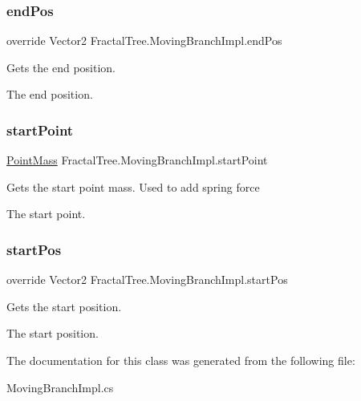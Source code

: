 \subsubsection{\texorpdfstring{end\+Pos}{endPos}}
{\footnotesize\ttfamily override Vector2 Fractal\+Tree.\+Moving\+Branch\+Impl.\+end\+Pos\hspace{0.3cm}{\ttfamily [get]}}



Gets the end position. 

The end position.\hypertarget{class_fractal_tree_1_1_moving_branch_impl_a360370cd5f0fb613596cb8d0fe942ffe}{}\label{class_fractal_tree_1_1_moving_branch_impl_a360370cd5f0fb613596cb8d0fe942ffe} 
\subsubsection{\texorpdfstring{start\+Point}{startPoint}}
{\footnotesize\ttfamily \hyperlink{class_fractal_tree_1_1_point_mass}{Point\+Mass} Fractal\+Tree.\+Moving\+Branch\+Impl.\+start\+Point\hspace{0.3cm}{\ttfamily [get]}}



Gets the start point mass. Used to add spring force 

The start point.\hypertarget{class_fractal_tree_1_1_moving_branch_impl_a520d7fca22147e6a552b4c4f2b946259}{}\label{class_fractal_tree_1_1_moving_branch_impl_a520d7fca22147e6a552b4c4f2b946259} 
\subsubsection{\texorpdfstring{start\+Pos}{startPos}}
{\footnotesize\ttfamily override Vector2 Fractal\+Tree.\+Moving\+Branch\+Impl.\+start\+Pos\hspace{0.3cm}{\ttfamily [get]}}



Gets the start position. 

The start position.

The documentation for this class was generated from the following file\+:\begin{DoxyCompactItemize}
\item 
Moving\+Branch\+Impl.\+cs\end{DoxyCompactItemize}
